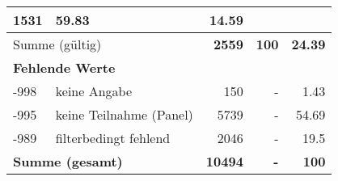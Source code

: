 \begin{longtable}{lXrrr}
       \num{1531} &
       \num[round-mode=places,round-precision=2]{59.83} &
         \num[round-mode=places,round-precision=2]{14.59} \\
     \midrule
     \multicolumn{2}{l}{Summe (gültig)} &
       \textbf{\num{2559}} &
     \textbf{\num{100}} &
       \textbf{\num[round-mode=places,round-precision=2]{24.39}} \\
     \multicolumn{5}{l}{\textbf{Fehlende Werte}}\\
       -998 &
       keine Angabe &
         \num{150} &
        - &
         \num[round-mode=places,round-precision=2]{1.43} \\
       -995 &
       keine Teilnahme (Panel) &
         \num{5739} &
        - &
         \num[round-mode=places,round-precision=2]{54.69} \\
       -989 &
       filterbedingt fehlend &
         \num{2046} &
        - &
         \num[round-mode=places,round-precision=2]{19.5} \\
     \midrule
     \multicolumn{2}{l}{\textbf{Summe (gesamt)}} &
          \textbf{\num{10494}} &
        \textbf{-} &
        \textbf{\num{100}} \\
     \bottomrule
     \end{longtable}
     
